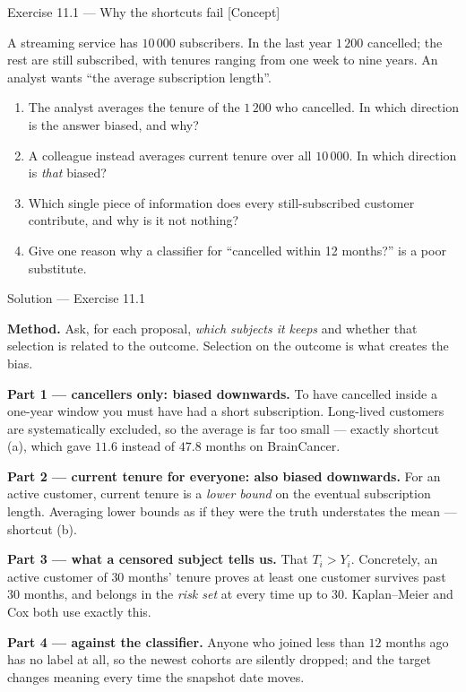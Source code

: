 \documentclass[aspectratio=169,11pt]{beamer}
\begin{document}
\begin{frame}{Exercise 11.1 --- Why the shortcuts fail [Concept]}
\begin{exercise}
  A streaming service has $10\,000$ subscribers. In the last year $1\,200$ cancelled;
  the rest are still subscribed, with tenures ranging from one week to nine years.
  An analyst wants ``the average subscription length''.
  \begin{enumerate}
    \item The analyst averages the tenure of the $1\,200$ who cancelled. In which
          direction is the answer biased, and why?
    \item A colleague instead averages current tenure over all $10\,000$. In which
          direction is \emph{that} biased?
    \item Which single piece of information does every still-subscribed customer
          contribute, and why is it not nothing?
    \item Give one reason why a classifier for ``cancelled within 12 months?'' is a
          poor substitute.
  \end{enumerate}
\end{exercise}
\end{frame}

\begin{frame}{Solution --- Exercise 11.1}
\begin{solutionbox}
  \textbf{Method.} Ask, for each proposal, \emph{which subjects it keeps} and whether that
  selection is related to the outcome. Selection on the outcome is what creates the bias.

  \medskip
  \textbf{Part 1 --- cancellers only: biased downwards.} To have cancelled inside a
  one-year window you must have had a short subscription. Long-lived customers are
  systematically excluded, so the average is far too small --- exactly shortcut (a),
  which gave $11.6$ instead of $47.8$ months on BrainCancer.

  \medskip
  \textbf{Part 2 --- current tenure for everyone: also biased downwards.} For an active
  customer, current tenure is a \emph{lower bound} on the eventual subscription length.
  Averaging lower bounds as if they were the truth understates the mean --- shortcut (b).

  \medskip
  \textbf{Part 3 --- what a censored subject tells us.} That $T_i>Y_i$. Concretely, an
  active customer of $30$ months' tenure proves at least one customer survives past
  $30$ months, and belongs in the \emph{risk set} at every time up to $30$. Kaplan--Meier
  and Cox both use exactly this.

  \medskip
  \textbf{Part 4 --- against the classifier.} Anyone who joined less than $12$ months ago
  has no label at all, so the newest cohorts are silently dropped; and the target changes
  meaning every time the snapshot date moves.
\end{solutionbox}
\end{frame}
\end{document}
